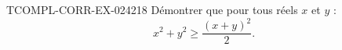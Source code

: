 \begin{exercice}{TCOMPL-CORR-EX-024}{2}{18}
Démontrer que pour tous réels $x$ et $y$ :
\[ x^2 + y^2 \geq \frac{(x+y)^2}{2}. \]

\end{exercice}
